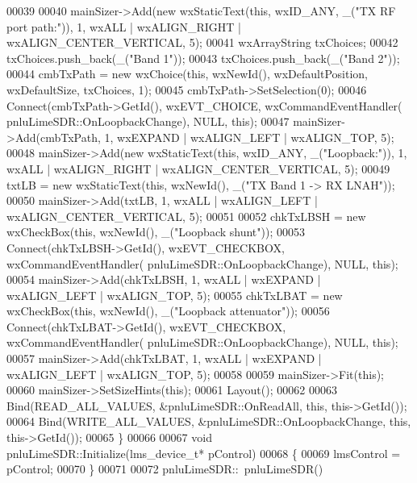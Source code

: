 \begin{DoxyCode}
00039     
00040     mainSizer->Add(\textcolor{keyword}{new} wxStaticText(\textcolor{keyword}{this}, wxID\_ANY, \_(\textcolor{stringliteral}{"TX RF port path:"})), 1, wxALL | wxALIGN\_RIGHT | 
      wxALIGN\_CENTER\_VERTICAL, 5);
00041     wxArrayString txChoices;
00042     txChoices.push\_back(\_(\textcolor{stringliteral}{"Band 1"}));
00043     txChoices.push\_back(\_(\textcolor{stringliteral}{"Band 2"}));
00044     cmbTxPath = \textcolor{keyword}{new} wxChoice(\textcolor{keyword}{this}, wxNewId(), wxDefaultPosition, wxDefaultSize, txChoices, 1);
00045     cmbTxPath->SetSelection(0);
00046     Connect(cmbTxPath->GetId(), wxEVT\_CHOICE, wxCommandEventHandler(
      pnluLimeSDR::OnLoopbackChange), NULL, \textcolor{keyword}{this});
00047     mainSizer->Add(cmbTxPath, 1, wxEXPAND | wxALIGN\_LEFT | wxALIGN\_TOP, 5);
00048     mainSizer->Add(\textcolor{keyword}{new} wxStaticText(\textcolor{keyword}{this}, wxID\_ANY, \_(\textcolor{stringliteral}{"Loopback:"})), 1, wxALL | wxALIGN\_RIGHT | 
      wxALIGN\_CENTER\_VERTICAL, 5);
00049     txtLB = \textcolor{keyword}{new} wxStaticText(\textcolor{keyword}{this}, wxNewId(), \_(\textcolor{stringliteral}{"TX Band 1 -> RX LNAH"}));
00050     mainSizer->Add(txtLB, 1, wxALL | wxALIGN\_LEFT | wxALIGN\_CENTER\_VERTICAL, 5);
00051     
00052     chkTxLBSH = \textcolor{keyword}{new} wxCheckBox(\textcolor{keyword}{this}, wxNewId(), \_(\textcolor{stringliteral}{"Loopback shunt"}));
00053     Connect(chkTxLBSH->GetId(), wxEVT\_CHECKBOX, wxCommandEventHandler(
      pnluLimeSDR::OnLoopbackChange), NULL, \textcolor{keyword}{this});
00054     mainSizer->Add(chkTxLBSH, 1, wxALL | wxEXPAND | wxALIGN\_LEFT | wxALIGN\_TOP, 5);
00055     chkTxLBAT = \textcolor{keyword}{new} wxCheckBox(\textcolor{keyword}{this}, wxNewId(), \_(\textcolor{stringliteral}{"Loopback attenuator"}));
00056     Connect(chkTxLBAT->GetId(), wxEVT\_CHECKBOX, wxCommandEventHandler(
      pnluLimeSDR::OnLoopbackChange), NULL, \textcolor{keyword}{this});
00057     mainSizer->Add(chkTxLBAT, 1, wxALL | wxEXPAND | wxALIGN\_LEFT | wxALIGN\_TOP, 5);
00058 
00059     mainSizer->Fit(\textcolor{keyword}{this});
00060     mainSizer->SetSizeHints(\textcolor{keyword}{this});
00061     Layout();
00062 
00063     Bind(READ\_ALL\_VALUES, &pnluLimeSDR::OnReadAll, \textcolor{keyword}{this}, this->GetId());
00064     Bind(WRITE\_ALL\_VALUES, &pnluLimeSDR::OnLoopbackChange, \textcolor{keyword}{this}, this->GetId());
00065 \}
00066 
00067 \textcolor{keywordtype}{void} pnluLimeSDR::Initialize(lms_device_t* pControl)
00068 \{
00069     lmsControl = pControl;
00070 \}
00071 
00072 pnluLimeSDR::~pnluLimeSDR()

\end{DoxyCode}
